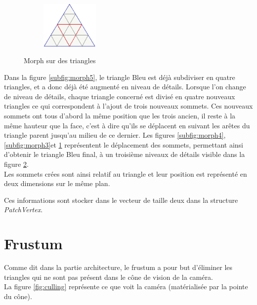 \begin{figure}[H]
\begin{subfigure}[b]{0.16\textwidth}
       \caption{}\label{subfig:morph2}
    \end{subfigure}
     ~
    \begin{subfigure}[b]{0.16\textwidth}
       \centering \includegraphics[width=\textwidth,height=2.3cm]{img/morph1.png}
       \caption{}\label{subfig:morph1}
    \end{subfigure}
    \caption{Morph sur des triangles}\label{fig:morphTri}
\end{figure}

    Dans la figure \ref{subfig:morph5}, le triangle Bleu est déjà subdiviser en quatre triangles, et a donc déjà été augmenté en niveau de détails.
    Lorsque l'on change de niveau de détails, chaque triangle concerné est divisé en quatre nouveaux triangles ce qui correspondent à l'ajout de trois nouveaux sommets. Ces nouveaux sommets ont tous d'abord la même position que les trois ancien, il reste à la même hauteur que la face, c'est à dire qu'ils se déplacent en suivant les arêtes du triangle parent jusqu'au milieu de ce dernier.
    Les figures \ref{subfig:morph4}, \ref{subfig:morph3}et \ref{subfig:morph2} représentent le déplacement des sommets, permettant ainsi d'obtenir le triangle Bleu final, à un troisième niveaux de détails visible dans la figure \ref{subfig:morph1}.\\
    
    Les sommets crées sont ainsi relatif au triangle et leur position est représenté en deux dimensions sur le même plan.
  
  Ces informations sont stocker dans le vecteur de taille deux dans la structure \textit{PatchVertex}.\\
  
  
  
  
  \section{Frustum}
  
  Comme dit dans la partie architecture, le frustum a pour but d'éliminer les triangles qui ne sont pas présent dans le cône de vision de la caméra.\\
  La figure \ref{fig:culling} représente ce que voit la caméra (matérialisée par la pointe du cône).
  
